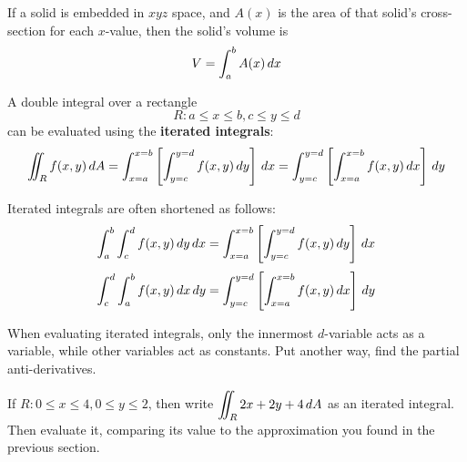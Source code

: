 \documentclass[letterpaper, twoside, 12pt]{book}
\begin{document}
\begin{definition}
  If a solid is embedded in $xyz$ space, and $A(x)$ is the area of that
  solid's cross-section for each $x$-value, then the solid's volume is
    \[
      V  = \int_a^b A(x)\,d{x}
    \]
\end{definition}

\begin{theorem}
  A double integral over a rectangle
    \[
      R: a\leq x\leq b, c\leq y\leq d
    \]
      can be evaluated using the \textbf{iterated integrals}:
    \[
      \iint_R f(x,y)\,d{A}
        =
      \int_{x=a}^{x=b}\left[\int_{y=c}^{y=d} f(x,y)\,d{y}\right]\,d{x}
        =
      \int_{y=c}^{y=d}\left[\int_{x=a}^{x=b} f(x,y)\,d{x}\right]\,d{y}
    \]
\end{theorem}

\begin{remark}
  Iterated integrals are often shortened as follows:
    \[
      \int_{a}^{b}\int_{c}^{d} f(x,y)\,d{y}\,d{x}
        =
      \int_{x=a}^{x=b}\left[\int_{y=c}^{y=d} f(x,y)\,d{y}\right]\,d{x}
    \]
    \[
      \int_{c}^{d}\int_{a}^{b} f(x,y)\,d{x}\,d{y}
        =
      \int_{y=c}^{y=d}\left[\int_{x=a}^{x=b} f(x,y)\,d{x}\right]\,d{y}
    \]
\end{remark}

\begin{remark}
  When evaluating iterated integrals, only the innermost $d$-variable
  acts as a variable, while other variables act as constants.
  Put another way, find the partial anti-derivatives.
\end{remark}

          \begin{problem}
            If $R : 0\leq x\leq 4, 0\leq y\leq 2 $, then write
            $\displaystyle\iint_R 2x+2y+4 \,d{A}$
            as an iterated integral. Then evaluate it, comparing its
            value to the approximation you found in the previous section.
          \end{problem}

          \begin{solution}

          \end{solution}

          \begin{contributors}
          \end{contributors}
\end{document}
